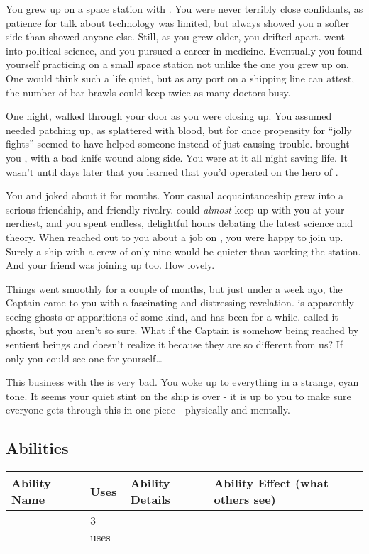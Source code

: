 \documentclass[char]{TMFHope}
\begin{document}
\name{\cMed{}}

You grew up on a space station with \cDip{\full}. You were never terribly close confidants, as \cDip{\their} patience for talk about technology was limited, but \cDip{\they} always showed you a softer side than \cDip{\they} showed anyone else. Still, as you grew older, you drifted apart. \cDip{} went into political science, and you pursued a career in medicine. Eventually you found yourself practicing on a small space station not unlike the one you grew up on. One would think such a life quiet, but as any port on a shipping line can attest, the number of bar-brawls could keep twice as many doctors busy.

One night, \cSci{\full} walked through your door as you were closing up. You assumed \cSci{\they} needed patching up, as \cSci{\they} \cSci{\were} splattered with blood, but for once \cSci{\their} propensity for ``jolly fights'' seemed to have helped someone instead of just causing trouble. \cSci{\They} brought you \cCap{\full}, with a bad knife wound along \cCap{\their} side. You were at it all night saving \cCap{\their} life. It wasn't until days later that you learned that you'd operated on the hero of \pBattle{}.

You and \cSci{} joked about it for months. Your casual acquaintanceship grew into a serious friendship, and friendly rivalry. \cSci{} could \emph{almost} keep up with you at your nerdiest, and you spent endless, delightful hours debating the latest science and theory. When \cCap{} reached out to you about a job on \pNew{}, you were happy to join up. Surely a ship with a crew of only nine would be quieter than working the station. And your friend \cSci{} was joining up too. How lovely.

Things went smoothly for a couple of months, but just under a week ago, the Captain came to you with a fascinating and distressing revelation. \cCap{} is apparently seeing ghosts or apparitions of some kind, and has been for a while. \cCap{\They} called it ghosts, but you aren't so sure. What if the Captain is somehow being reached by sentient beings and doesn't realize it because they are so different from us? If only you could see one for yourself\ldots

This business with the \pNew{} is very bad. You woke up to everything in a strange, cyan tone. It seems your quiet stint on the ship is over - it is up to you to make sure everyone gets through this in one piece - physically and mentally.

\subsection*{Abilities}
\begin{tabular}{|p{3cm}|p{1.5cm}|p{6.5cm}|p{5cm}|} 
 \hline
 \textbf{Ability Name} & \textbf{Uses} & \textbf{Ability Details} & \textbf{Ability Effect (what others see)} \\ 
\hline 
\aFirstAid{\MYname} & 3 uses & \aFirstAid{\MYtext} & \aFirstAid{\MYeffect}\\ 
 \hline
\end{tabular}
\end{document}
